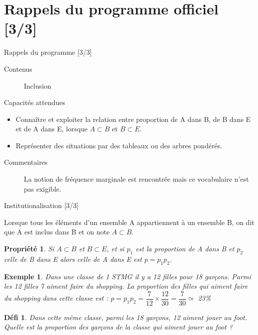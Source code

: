 \documentclass[presentation]{beamer}
\newtheorem{property}{Propriété}[section]
\newtheorem{defi}{Défi}[section]
\newtheorem{exe}{Exemple}[section]
\begin{document}
\section{Rappels du programme officiel [3/3]}
\label{sec:orgc603c6b}
\begin{frame}[label={sec:org18faf33}]{Rappels du programme [3/3]}
\begin{description}
\item[{Contenus}] Inclusion
\item[{Capacités attendues}] 
\end{description}


\begin{itemize}
\item Connaître et exploiter la relation entre proportion de A
dans B, de B dans E et de A dans E, lorsque \(A\subset B\) et
\(B\subset E\).
\item Représenter des situations par des tableaux ou des arbres pondérés.
\end{itemize}
\begin{description}
\item[{Commentaires}] La notion de fréquence marginale est rencontrée
mais ce vocabulaire n'est pas exigible.
\end{description}
\end{frame}
\begin{frame}[label={sec:org03cd4ff}]{Institutionalisation [3/3]}
\begin{definition}
Lorsque tous les éléments d'un ensemble A appartiennent à un
ensemble B, on dit que \alert{A est inclus dans B} et on note \(A\subset B\).
\end{definition}

\begin{property}
Si \(A\subset B\) et \(B\subset E\), et si \(p_1\) est la proportion de A
dans B et \(p_2\) celle de B dans E alors celle de A dans E est \(p = p_1p_2\).
\end{property}

\begin{exe}
Dans une classe de 1 STMG il y a 12 filles pour 18
garçons. Parmi les 12 filles 7 aiment faire du shopping.
La proportion des filles qui aiment faire du shopping dans cette
classe est : \(p = p_1p_2 = \dfrac{7}{12}\times \dfrac{12}{30} =
   \dfrac{7}{30} \simeq\) 23\%
\end{exe}

\begin{defi}
Dans cette même classe, parmi les 18 garçons, 12 aiment jouer au
foot. Quelle est la proportion des garçons de la classe qui aiment
jouer au foot ?
\end{defi}
\end{frame}
\end{document}
